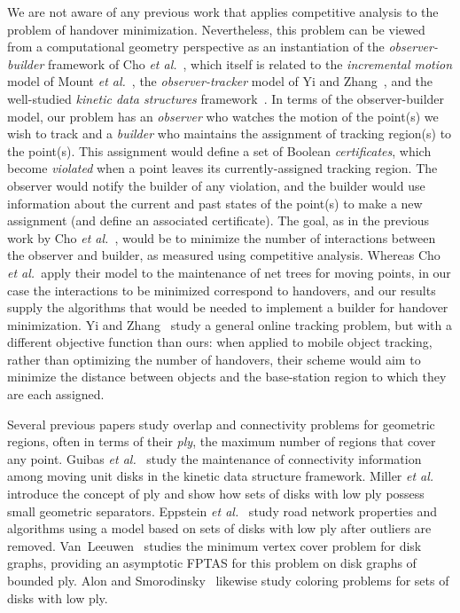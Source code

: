 \documentclass[runningheads]{llncs}
\begin{document}
We are not aware of any previous work that applies competitive analysis to the problem of 
handover minimization.
Nevertheless, this problem 
can be viewed from a computational geometry perspective as an instantiation of the 
\emph{observer-builder} framework of Cho {\it et al.}~\cite{cmp-mnntu-09},
which itself is related to the \emph{incremental motion} model of
Mount {\it et al.}~\cite{mnpsw-cfim-04}, the 
\emph{observer-tracker} model
of Yi and Zhang~\cite{yz-mdot-09}, and the well-studied 
\emph{kinetic data structures} 
framework~\cite{aeg-kbisd-98,bgsz-pekds-97,g-kdssar-98,ghsz-kcud-01}.
In terms of the observer-builder model,
our problem has an \emph{observer} who watches the motion 
of the point(s) we wish to track and a \emph{builder} who maintains
the assignment of tracking region(s) to the point(s).
This assignment would define a set of Boolean \emph{certificates}, which become \emph{violated} when a
point leaves its currently-assigned tracking region. The observer
would notify the builder of any violation, and the builder would use information about the current
and past states of the point(s) to make a new assignment (and define
an associated certificate).
The goal, as in the previous work by
Cho {\it et al.}~\cite{cmp-mnntu-09}, would be to minimize the
number of interactions between the observer and builder, as measured using
competitive analysis.
Whereas Cho {\it et al.}~apply their model to the maintenance of 
net trees for moving points, 
in our case the interactions to be minimized correspond to handovers, and our results supply the algorithms that would be needed to implement a builder for handover minimization.
Yi and Zhang~\cite{yz-mdot-09} study a general online tracking problem, but with a different objective function than ours: when applied to mobile object tracking, 
rather than optimizing the number of handovers, their scheme would
aim to minimize the distance between objects and the
base-station region to which they are each assigned.

Several previous
papers study overlap and connectivity problems for geometric
regions, often in terms of their \emph{ply}, the maximum number of regions that cover any point.
Guibas {\it et al.}~\cite{ghsz-kcud-01} study the
maintenance of connectivity information among moving unit
disks in the kinetic data structure framework.
Miller {\it et al.}~\cite{mttv-sspnn-97} introduce the concept of ply and show how sets of
disks with low ply possess small geometric separators.
Eppstein {\it et al.}~\cite{eg-snprn-08,egt-gortc-09} study road
network properties and algorithms using a model based on 
sets of disks with low ply after outliers are removed.
Van~Leeuwen~\cite{v-basdg-06} studies the
minimum vertex cover problem for disk
graphs, providing an asymptotic FPTAS for this problem on
disk graphs of bounded ply.
Alon and Smorodinsky~\cite{as-cfcsd-06} likewise study 
coloring problems for sets of disks with low ply.
\end{document}
